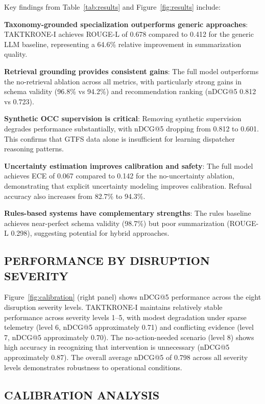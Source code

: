 \documentclass{IEEEoj}
\begin{document}
Key findings from Table~\ref{tab:results} and Figure~\ref{fig:results} include:

\textbf{Taxonomy-grounded specialization outperforms generic approaches}: TAKTKRONE-I achieves ROUGE-L of 0.678 compared to 0.412 for the generic LLM baseline, representing a 64.6\% relative improvement in summarization quality.

\textbf{Retrieval grounding provides consistent gains}: The full model outperforms the no-retrieval ablation across all metrics, with particularly strong gains in schema validity (96.8\% vs 94.2\%) and recommendation ranking (nDCG@5 0.812 vs 0.723).

\textbf{Synthetic OCC supervision is critical}: Removing synthetic supervision degrades performance substantially, with nDCG@5 dropping from 0.812 to 0.601. This confirms that GTFS data alone is insufficient for learning dispatcher reasoning patterns.

\textbf{Uncertainty estimation improves calibration and safety}: The full model achieves ECE of 0.067 compared to 0.142 for the no-uncertainty ablation, demonstrating that explicit uncertainty modeling improves calibration. Refusal accuracy also increases from 82.7\% to 94.3\%.

\textbf{Rules-based systems have complementary strengths}: The rules baseline achieves near-perfect schema validity (98.7\%) but poor summarization (ROUGE-L 0.298), suggesting potential for hybrid approaches.

\subsection{PERFORMANCE BY DISRUPTION SEVERITY}

Figure~\ref{fig:calibration} (right panel) shows nDCG@5 performance across the eight disruption severity levels. TAKTKRONE-I maintains relatively stable performance across severity levels 1--5, with modest degradation under sparse telemetry (level 6, nDCG@5 approximately 0.71) and conflicting evidence (level 7, nDCG@5 approximately 0.70). The no-action-needed scenario (level 8) shows high accuracy in recognizing that intervention is unnecessary (nDCG@5 approximately 0.87). The overall average nDCG@5 of 0.798 across all severity levels demonstrates robustness to operational conditions.

\subsection{CALIBRATION ANALYSIS}
\end{document}
